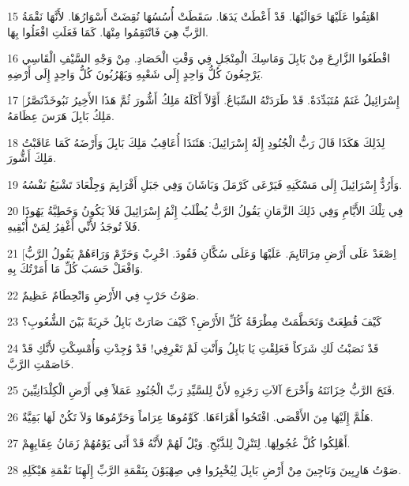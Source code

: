 \par 15 اهْتِفُوا عَلَيْهَا حَوَالَيْهَا. قَدْ أَعْطَتْ يَدَهَا. سَقَطَتْ أُسُسُهَا نُقِضَتْ أَسْوَارُهَا. لأَنَّهَا نَقْمَةُ الرَّبِّ هِيَ فَانْتَقِمُوا مِنْهَا. كَمَا فَعَلَتِ افْعَلُوا بِهَا.
\par 16 اقْطَعُوا الزَّارِعَ مِنْ بَابِلَ وَمَاسِكَ الْمِنْجَلِ فِي وَقْتِ الْحَصَادِ. مِنْ وَجْهِ السَّيْفِ الْقَاسِي يَرْجِعُونَ كُلُّ وَاحِدٍ إِلَى شَعْبِهِ وَيَهْرُبُونَ كُلُّ وَاحِدٍ إِلَى أَرْضِهِ.
\par 17 [إِسْرَائِيلُ غَنَمٌ مُتَبَدِّدَةٌ. قَدْ طَرَدَتْهُ السِّبَاعُ. أَوَّلاً أَكَلَهُ مَلِكُ أَشُّورَ ثُمَّ هَذَا الأَخِيرُ نَبُوخَذْنَصَّرُ مَلِكُ بَابِلَ هَرَسَ عِظَامَهُ.
\par 18 لِذَلِكَ هَكَذَا قَالَ رَبُّ الْجُنُودِ إِلَهُ إِسْرَائِيلَ: هَئَنَذَا أُعَاقِبُ مَلِكَ بَابِلَ وَأَرْضَهُ كَمَا عَاقَبْتُ مَلِكَ أَشُّورَ.
\par 19 وَأَرُدُّ إِسْرَائِيلَ إِلَى مَسْكَنِهِ فَيَرْعَى كَرْمَلَ وَبَاشَانَ وَفِي جَبَلِ أَفْرَايِمَ وَجِلْعَادَ تَشْبَعُ نَفْسُهُ.
\par 20 فِي تِلْكَ الأَيَّامِ وَفِي ذَلِكَ الزَّمَانِ يَقُولُ الرَّبُّ يُطْلَبُ إِثْمُ إِسْرَائِيلَ فَلاَ يَكُونُ وَخَطِيَّةُ يَهُوذَا فَلاَ تُوجَدُ لأَنِّي أَغْفِرُ لِمَنْ أُبْقِيهِ.
\par 21 [اِصْعَدْ عَلَى أَرْضِ مِرَاثَايِمَ. عَلَيْهَا وَعَلَى سُكَّانِ فَقُودَ. اخْرِبْ وَحَرِّمْ وَرَاءَهُمْ يَقُولُ الرَّبُّ وَافْعَلْ حَسَبَ كُلِّ مَا أَمَرْتُكَ بِهِ.
\par 22 صَوْتُ حَرْبٍ فِي الأَرْضِ وَانْحِطَامٌ عَظِيمٌ.
\par 23 كَيْفَ قُطِعَتْ وَتَحَطَّمَتْ مِطْرَقَةُ كُلِّ الأَرْضِ؟ كَيْفَ صَارَتْ بَابِلُ خَرِبَةً بَيْنَ الشُّعُوبِ؟
\par 24 قَدْ نَصَبْتُ لَكِ شَرَكاً فَعَلِقْتِ يَا بَابِلُ وَأَنْتِ لَمْ تَعْرِفِي! قَدْ وُجِدْتِ وَأُمْسِكْتِ لأَنَّكِ قَدْ خَاصَمْتِ الرَّبَّ.
\par 25 فَتَحَ الرَّبُّ خِزَانَتَهُ وَأَخْرَجَ آلاَتِ رَجَزِهِ لأَنَّ لِلسَّيِّدِ رَبِّ الْجُنُودِ عَمَلاً فِي أَرْضِ الْكِلْدَانِيِّينَ.
\par 26 هَلُمَّ إِلَيْهَا مِنَ الأَقْصَى. افْتَحُوا أَهْرَاءَهَا. كَوِّمُوهَا عِرَاماً وَحَرِّمُوهَا وَلاَ تَكُنْ لَهَا بَقِيَّةٌ.
\par 27 أَهْلِكُوا كُلَّ عُجُولِهَا. لِتَنْزِلْ لِلذَّبْحِ. وَيْلٌ لَهُمْ لأَنَّهُ قَدْ أَتَى يَوْمُهُمْ زَمَانُ عِقَابِهِمْ.
\par 28 صَوْتُ هَارِبِينَ وَنَاجِينَ مِنْ أَرْضِ بَابِلَ لِيُخْبِرُوا فِي صِهْيَوْنَ بِنَقْمَةِ الرَّبِّ إِلَهِنَا نَقْمَةِ هَيْكَلِهِ.

